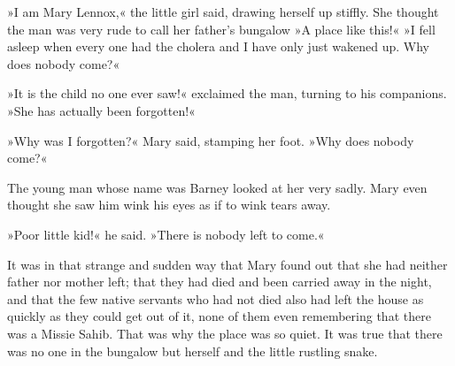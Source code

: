 »I am Mary Lennox,« the little girl said, drawing herself up stiffly. She thought the man was very rude to call her father's bungalow »A place like this!« »I fell asleep when every one had the cholera and I have only just wakened up. Why does nobody come?«

»It is the child no one ever saw!« exclaimed the man, turning to his companions. »She has actually been forgotten!«

»Why was I forgotten?« Mary said, stamping her foot. »Why does nobody come?«

The young man whose name was Barney looked at her very sadly. Mary even thought she saw him wink his eyes as if to wink tears away.

»Poor little kid!« he said. »There is nobody left to come.«

It was in that strange and sudden way that Mary found out that she had neither father nor mother left; that they had died and been carried away in the night, and that the few native servants who had not died also had left the house as quickly as they could get out of it, none of them even remembering that there was a Missie Sahib. That was why the place was so quiet. It was true that there was no one in the bungalow but herself and the little rustling snake.